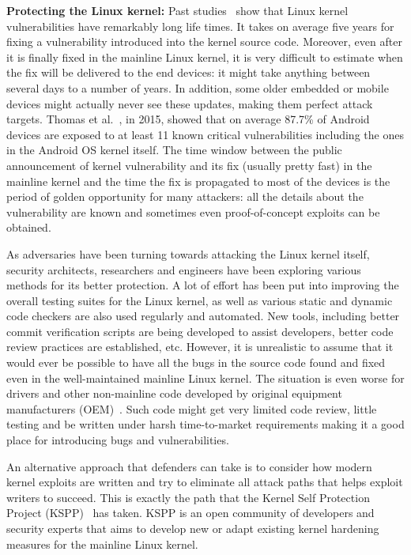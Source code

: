 \textbf{Protecting the Linux kernel:}   Past studies~\cite{stoep2016android, cooklss2016} show that Linux kernel vulnerabilities have remarkably long life times. It takes on average five years for fixing a vulnerability introduced into the kernel source code. Moreover, even after it is finally fixed in the mainline Linux kernel, it is very difficult to estimate when the fix will be delivered to the end devices: it might take anything between several days to a number of years. In addition, some older embedded or mobile devices might actually never see these updates, making them perfect attack targets. Thomas et al.~\cite{Thomas2015}, in 2015, showed that on average 87.7\% of Android devices are exposed to at least 11 known critical vulnerabilities including the ones in the Android OS kernel itself. The time window between the public announcement of kernel vulnerability and its fix (usually pretty fast) in the mainline kernel and the time the fix is propagated to most of the devices is the period of golden opportunity for many attackers: all the details about the vulnerability are known and sometimes even proof-of-concept exploits can be obtained.

As adversaries have been turning towards attacking the Linux kernel itself, security architects, researchers and engineers have been exploring various methods for its better protection. A lot of effort has been put into improving the overall testing suites for the Linux kernel, as well as various static and dynamic code checkers are also used regularly and automated. New tools, including better commit verification scripts are being developed to assist developers, better code review practices are established, etc. However, it is unrealistic to assume that it would ever be possible to have all the bugs in the source code found and fixed even in the well-maintained mainline Linux kernel. The situation is even worse for drivers and other non-mainline code developed by original equipment manufacturers (OEM)~\cite{stoep2016android}. Such code might get very limited code review, little testing and be written under harsh time-to-market requirements making it a good place for introducing bugs and vulnerabilities.

An alternative approach that defenders can take is to consider how modern kernel exploits are written and try to eliminate all attack paths that helps exploit writers to succeed. This is exactly the path that the Kernel Self Protection Project (KSPP)~\cite{kspp} has taken. KSPP is an open community of developers and security experts that aims to develop new or adapt existing kernel hardening measures for the mainline Linux kernel. 

